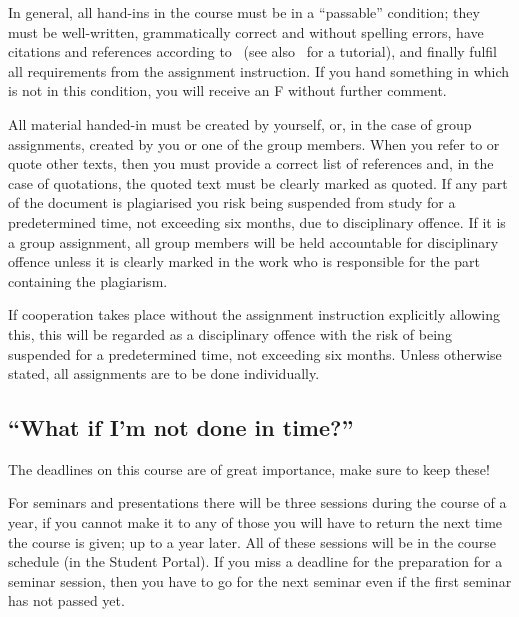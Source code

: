 In general, all hand-ins in the course must be in a \enquote{passable} 
condition; \ie they must be well-written, grammatically correct and without 
spelling errors, have citations and references according to~\cite{IEEEcitation} 
(see also~\cite{PurdueCitation} for a tutorial), and finally fulfil all 
requirements from the assignment instruction.
If you hand something in which is not in this condition, you will receive an 
F without further comment.

All material handed-in must be created by yourself, or, in the case of group 
assignments, created by you or one of the group members.
When you refer to or quote other texts, then you must provide a correct list of 
references and, in the case of quotations, the quoted text must be clearly 
marked as quoted.
If any part of the document is plagiarised you risk being suspended from study 
for a predetermined time, not exceeding six months, due to disciplinary 
offence.
If it is a group assignment, all group members will be held accountable for 
disciplinary offence unless it is clearly marked in the work who is responsible 
for the part containing the plagiarism.

If cooperation takes place without the assignment instruction explicitly 
allowing this, this will be regarded as a disciplinary offence with the risk of
being suspended for a predetermined time, not exceeding six months.
Unless otherwise stated, all assignments are to be done individually.

\subsection{\enquote{What if I'm not done in time?}}%
\label{sec:late}

The deadlines on this course are of great importance, make sure to keep these!

For seminars and presentations there will be three sessions during the course 
of a year, if you cannot make it to any of those you will have to return the 
next time the course is given; \ie up to a year later.
All of these sessions will be in the course schedule (in the Student Portal).
If you miss a deadline for the preparation for a seminar session, then you have 
to go for the next seminar even if the first seminar has not passed yet.

